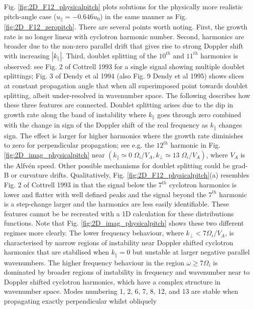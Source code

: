 \documentclass[12pt]{iopart}
\begin{document}
Fig. \ref{fig:2D_F12_physicalpitch} plots solutions for the physically more
realistic pitch-angle
case ($u_\parallel = -0.646 u_0$) in the same manner as Fig.
\ref{fig:2D_F12_zeropitch}. There are several points worth noting. First, the
growth rate is no longer linear with cyclotron harmonic number. Second,
harmonics are broader due to the non-zero parallel drift that gives rise to
strong Doppler shift with increasing $|k_\parallel|$. Third, doublet splitting
of the $10^{th}$ and $11^{th}$ harmonics is observed: see Fig. 2 of Cottrell 1993 for a single
signal showing multiple doublet splittings; Fig. 3 of Dendy et al 1994 (also
Fig. 9 Dendy et al 1995) shows slices at constant propagation angle that when
all superimposed point towards doublet splitting, albeit under-resolved in
wavenumber space. The following describes how these three features are
connected. Doublet splitting arises due to the dip in growth rate along the 
band of instability where
$k_\parallel$ goes through zero combined with the change in sign of the Doppler
shift of the real frequency as $k_\parallel$ changes sign. The effect is
larger for higher harmonics where the growth rate diminishes to zero for
perpendicular propagation; see e.g. the $12^{th}$ harmonic in Fig.
\ref{fig:2D_imag_physicalpitch} near $(k_\parallel \simeq 0\; \Omega_{i}/V_A,
k_\bot \simeq 13\; \Omega_{i}/V_A)$, where $V_A$ is the Alfv{\'e}n speed. Other possible mechanisms for
doublet splitting could be grad-B or curvature
drifts\cite{Cottrell1993,Fulop1998}. Qualitatively, Fig.
\ref{fig:2D_F12_physicalpitch}(a) resembles Fig. 2 of Cottrell 1993 in that the
signal below the $7^{th}$ cyclotron harmonics is lower and flatter with well
defined peaks and the signal beyond the $7^{th}$ harmonic is a step-change
larger and the harmonics are less easily identifiable. These features cannot be
be recreated with a 1D calculation for these distributions functions. Note that
Fig. \ref{fig:2D_imag_physicalpitch} shows these two different regimes more
clearly. The lower frequency behaviour, where $k_\perp < 7 \Omega_i/V_A$, is
characterised by narrow regions of instability near Doppler shifted cyclotron
harmonics that are stabilised when $k_\parallel=0$ but unstable at larger
negative parallel wavenumbers. The higher frequency behaviour in the region
$\omega\geq 7\Omega_i$ is dominated by broader regions of instability in
frequency and wavenumber near to Doppler shifted cyclotron harmonics, which have
a complex structure in wavenumber space. Modes numbering 1, 2, 6, 7, 8, 12, and
13 are stable when propagating exactly perpendicular whilst obliquely
\end{document}
